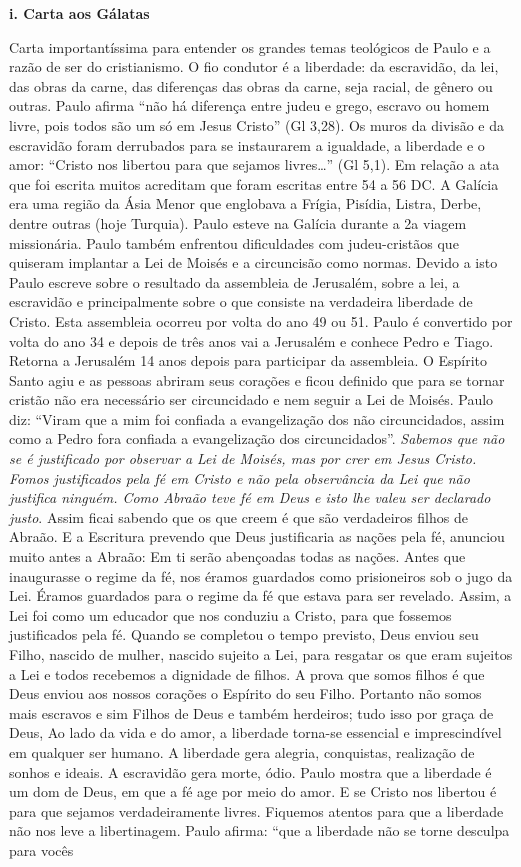 \documentclass[
]{book}
\begin{document}
\textbf{i. Carta aos Gálatas}

Carta importantíssima para entender os grandes temas teológicos de Paulo e a razão de ser do cristianismo. O fio condutor é a liberdade: da escravidão, da lei, das obras da carne, das diferenças das obras da carne, seja racial, de gênero ou outras. Paulo afirma ``não há diferença entre judeu e grego, escravo ou homem livre, pois todos são um só em Jesus Cristo'' (Gl 3,28). Os muros da divisão e da escravidão foram derrubados para se instaurarem a igualdade, a liberdade e o amor: ``Cristo nos libertou para que sejamos livres\ldots{}'' (Gl 5,1). Em relação a ata que foi escrita muitos acreditam que foram escritas entre 54 a 56 DC. A Galícia era uma região da Ásia Menor que englobava a Frígia, Pisídia, Listra, Derbe, dentre outras (hoje Turquia). Paulo esteve na Galícia durante a 2a viagem missionária. Paulo também enfrentou dificuldades com judeu-cristãos que quiseram implantar a Lei de Moisés e a circuncisão como normas. Devido a isto Paulo escreve sobre o resultado da assembleia de Jerusalém, sobre a lei, a escravidão e principalmente sobre o que consiste na verdadeira liberdade de Cristo. Esta assembleia ocorreu por volta do ano 49 ou 51. Paulo é convertido por volta do ano 34 e depois de três anos vai a Jerusalém e conhece Pedro e Tiago. Retorna a Jerusalém 14 anos depois para participar da assembleia. O Espírito Santo agiu e as pessoas abriram seus corações e ficou definido que para se tornar cristão não era necessário ser circuncidado e nem seguir a Lei de Moisés. Paulo diz: ``Viram que a mim foi confiada a evangelização dos não circuncidados, assim como a Pedro fora confiada a evangelização dos circuncidados''. \emph{Sabemos que não se é justificado por observar a Lei de Moisés, mas por crer em Jesus Cristo. Fomos justificados pela fé em Cristo e não pela observância da Lei que não justifica ninguém. Como Abraão teve fé em Deus e isto lhe valeu ser declarado justo}. Assim ficai sabendo que os que creem é que são verdadeiros filhos de Abraão. E a Escritura prevendo que Deus justificaria as nações pela fé, anunciou muito antes a Abraão: Em ti serão abençoadas todas as nações. Antes que inaugurasse o regime da fé, nos éramos guardados como prisioneiros sob o jugo da Lei. Éramos guardados para o regime da fé que estava para ser revelado. Assim, a Lei foi como um educador que nos conduziu a Cristo, para que fossemos justificados pela fé. Quando se completou o tempo previsto, Deus enviou seu Filho, nascido de mulher, nascido sujeito a Lei, para resgatar os que eram sujeitos a Lei e todos recebemos a dignidade de filhos. A prova que somos filhos é que Deus enviou aos nossos corações o Espírito do seu Filho. Portanto não somos mais escravos e sim Filhos de Deus e também herdeiros; tudo isso por graça de Deus, Ao lado da vida e do amor, a liberdade torna-se essencial e imprescindível em qualquer ser humano. A liberdade gera alegria, conquistas, realização de sonhos e ideais. A escravidão gera morte, ódio. Paulo mostra que a liberdade é um dom de Deus, em que a fé age por meio do amor. E se Cristo nos libertou é para que sejamos verdadeiramente livres. Fiquemos atentos para que a liberdade não nos leve a libertinagem. Paulo afirma: ``que a liberdade não se torne desculpa para vocês 
\end{document}
